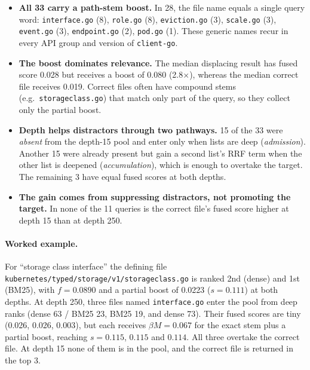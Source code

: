 \documentclass[11pt, letterpaper]{article}
\newcommand{\code}[1]{\texttt{#1}}
\begin{document}
\begin{itemize}
  \item \textbf{All 33 carry a path-stem boost.} In 28, the file name equals a single query word: \code{interface.go}
        (8), \code{role.go} (8), \code{eviction.go} (3), \code{scale.go} (3), \code{event.go} (3),
        \code{endpoint.go} (2), \code{pod.go} (1). These generic names recur in every API group and version of
        \code{client-go}.
  \item \textbf{The boost dominates relevance.} The median displacing result has fused score 0.028 but receives a boost
        of 0.080 (2.8$\times$), whereas the median correct file receives 0.019. Correct files often have compound stems
        (e.g.\ \code{storageclass.go}) that match only part of the query, so they collect only the partial boost.
  \item \textbf{Depth helps distractors through two pathways.} 15 of the 33 were \emph{absent} from the depth-15 pool
        and enter only when lists are deep (\emph{admission}). Another 15 were already present but gain a second
        list's RRF term when the other list is deepened (\emph{accumulation}), which is enough to overtake the
        target. The remaining 3 have equal fused scores at both depths.
  \item \textbf{The gain comes from suppressing distractors, not promoting the target.} In none of the 11 queries is the
        correct file's fused score higher at depth 15 than at depth 250.
\end{itemize}

\paragraph{Worked example.} For ``storage class interface'' the defining file
\code{kubernetes/typed/storage/v1/storageclass.go} is ranked 2nd (dense) and 1st (BM25), with $f{=}0.0890$ and a
partial boost of 0.0223 ($s{=}0.111$) at both depths. At depth 250, three files named \code{interface.go} enter the
pool from deep ranks (dense 63 / BM25 23, BM25 19, and dense 73). Their fused scores are tiny (0.026, 0.026, 0.003),
but each receives $\beta M{=}0.067$ for the exact stem plus a partial boost, reaching $s{=}0.115$, $0.115$ and $0.114$.
All three overtake the correct file. At depth 15 none of them is in the pool, and the correct file is returned in the top 3.

\end{document}
